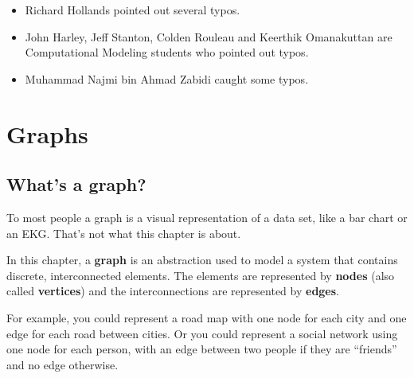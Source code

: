 \documentclass[10pt]{book}
\begin{document}
\small

\begin{itemize}

\item Richard Hollands pointed out several typos.

\item John Harley, Jeff Stanton, Colden Rouleau and
Keerthik Omanakuttan are Computational Modeling students who
pointed out typos.

\item Muhammad Najmi bin Ahmad Zabidi caught some typos.



\end{itemize}

\normalsize

\clearemptydoublepage

\begin{latexonly}

\tableofcontents

\clearemptydoublepage

\end{latexonly}

\mainmatter


\chapter{Graphs}

\section{What's a graph?}

To most people a graph is a visual representation of a data set, like
a bar chart or an EKG.  That's not what this chapter is about.

In this chapter, a {\bf graph} is an abstraction used to
model a system that contains discrete, interconnected elements.  The
elements are represented by {\bf nodes} (also called {\bf vertices})
and the interconnections are represented by {\bf edges}.

For example, you could represent a road map with one node for each
city and one edge for each road between cities.  Or you could
represent a social network using one node for each person, with an
edge between two people if they are ``friends'' and no edge otherwise.
\end{document}

